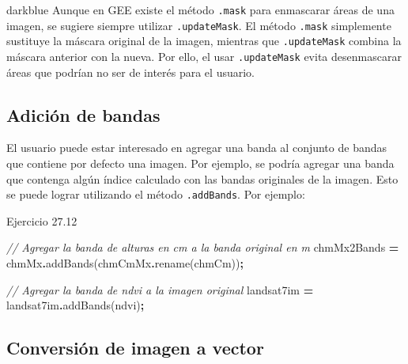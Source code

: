 \documentclass[
  12pt,
  letterpaper,
  twoside]{book}
\newenvironment{Shaded}{\begin{snugshade}}{\end{snugshade}}
\newcommand{\CommentTok}[1]{\textcolor[rgb]{0.56,0.35,0.01}{\textit{#1}}}
\newcommand{\FunctionTok}[1]{\textcolor[rgb]{0.00,0.00,0.00}{#1}}
\newcommand{\NormalTok}[1]{#1}
\newcommand{\OperatorTok}[1]{\textcolor[rgb]{0.81,0.36,0.00}{\textbf{#1}}}
\newcommand{\StringTok}[1]{\textcolor[rgb]{0.31,0.60,0.02}{#1}}
\begin{document}
\begin{bluebox2}

\begin{awesomeblock}{5pt}{\faLightbulb}{darkblue}
Aunque en GEE existe el método \texttt{.mask} para enmascarar áreas de una imagen, se sugiere siempre utilizar \texttt{.updateMask}. El método \texttt{.mask} simplemente sustituye la máscara original de la imagen, mientras que \texttt{.updateMask} combina la máscara anterior con la nueva. Por ello, el usar \texttt{.updateMask} evita desenmascarar áreas que podrían no ser de interés para el usuario.

\end{awesomeblock}

\end{bluebox2}

\hypertarget{adiciuxf3n-de-bandas}{%
\subsection*{Adición de bandas}\label{adiciuxf3n-de-bandas}}

El usuario puede estar interesado en agregar una banda al conjunto de bandas que contiene por defecto una imagen. Por ejemplo, se podría agregar una banda que contenga algún índice calculado con las bandas originales de la imagen. Esto se puede lograr utilizando el método \texttt{.addBands}. Por ejemplo:

Ejercicio 27.12

\begin{Shaded}
\begin{Highlighting}[]
\CommentTok{// Agregar la banda de alturas en cm a la banda original en m}
\NormalTok{chmMx2Bands }\OperatorTok{=}\NormalTok{ chmMx}\OperatorTok{.}\FunctionTok{addBands}\NormalTok{(chmCmMx}\OperatorTok{.}\FunctionTok{rename}\NormalTok{(}\StringTok{\textquotesingle{}chmCm\textquotesingle{}}\NormalTok{))}\OperatorTok{;}

\CommentTok{// Agregar la banda de ndvi a la imagen original}
\NormalTok{landsat7im }\OperatorTok{=}\NormalTok{ landsat7im}\OperatorTok{.}\FunctionTok{addBands}\NormalTok{(ndvi)}\OperatorTok{;}
\end{Highlighting}
\end{Shaded}

\hypertarget{conversiuxf3n-de-imagen-a-vector}{%
\subsection*{Conversión de imagen a vector}\label{conversiuxf3n-de-imagen-a-vector}}
\end{document}
